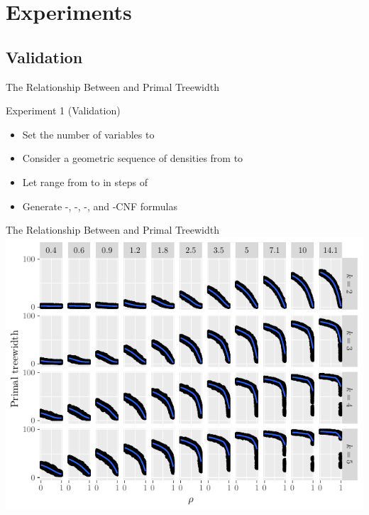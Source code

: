 \documentclass{beamer}
\begin{document}
\section{Experiments}

\subsection{Validation}

\begin{frame}{The Relationship Between \structure{$\rho$} and Primal Treewidth}
  \begin{block}{Experiment 1 (Validation)}
    \begin{itemize}
      \item Set the number of variables to 
      \item Consider a geometric sequence of  densities from
             to 
      \item Let \structure{$\rho$} range from  to 
            in steps of 
      \item Generate  -, -,
            -, and -CNF formulas
    \end{itemize}
  \end{block}
\end{frame}

\begin{frame}{The Relationship Between \structure{$\rho$} and Primal Treewidth}
  \includegraphics{regular_repetitiveness.pdf}
\end{frame}
\end{document}
